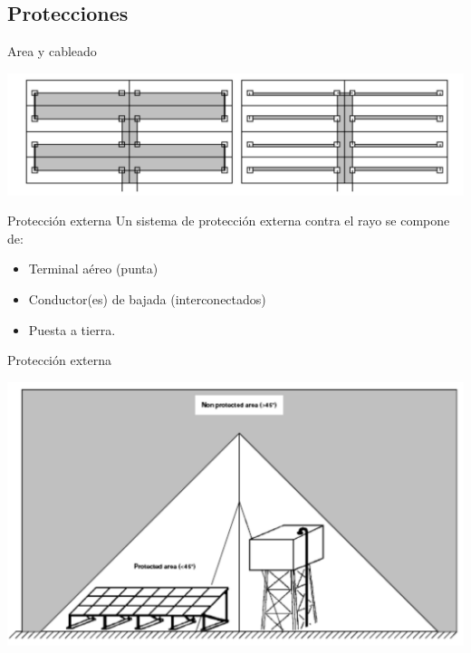 \documentclass[xcolor={usenames,svgnames,dvipsnames}]{beamer}
\begin{document}
\subsection{Protecciones}
\label{sec:org1ce1979}


\begin{frame}[label={sec:org72fdfb2}]{Area y cableado}
\begin{center}
\includegraphics[width=.9\linewidth]{../figs/BucleCableadoOptimo.pdf}
\end{center}
\end{frame}

\begin{frame}[label={sec:org3acb64f}]{Protección externa}
Un sistema de protección externa contra el rayo se compone de:

\begin{itemize}
\item Terminal aéreo (punta)

\item Conductor(es) de bajada (interconectados)

\item Puesta a tierra.
\end{itemize}
\end{frame}

\begin{frame}[label={sec:org7d3fad2}]{Protección externa}
\begin{center}
\includegraphics[width=.9\linewidth]{../figs/AreaProteccionPararrayos.pdf}
\end{center}
\end{frame}
\end{document}
